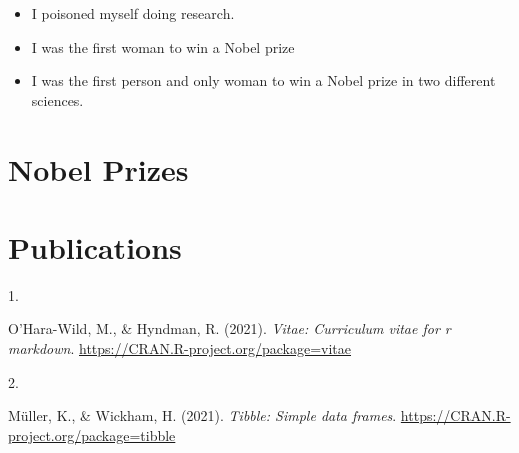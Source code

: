 \documentclass[10pt,a4paper,]{twentysecondcv}
\providecommand{\tightlist}{%
  \setlength{\itemsep}{0pt}\setlength{\parskip}{0pt}}
\newlength{\csllabelwidth}
\newcommand{\CSLLeftMargin}[1]{\parbox[t]{\csllabelwidth}{#1}}
\newcommand{\CSLRightInline}[1]{\parbox[t]{\linewidth - \csllabelwidth}{#1}}
\begin{document}
\begin{itemize}
\tightlist
\item
  I poisoned myself doing research.
\item
  I was the first woman to win a Nobel prize
\item
  I was the first person and only woman to win a Nobel prize in two
  different sciences.
\end{itemize}

\hypertarget{nobel-prizes}{%
\section{Nobel Prizes}\label{nobel-prizes}}

\nopagebreak

\begin{twentyshort}
\end{twentyshort}

\hypertarget{publications}{%
\section{Publications}\label{publications}}

\hypertarget{bibliography}{}
\leavevmode{}%
\CSLLeftMargin{1. }
\CSLRightInline{O'Hara-Wild, M., \& Hyndman, R. (2021). \emph{Vitae:
Curriculum vitae for r markdown}.
\url{https://CRAN.R-project.org/package=vitae}}

\leavevmode{}%
\CSLLeftMargin{2. }
\CSLRightInline{Müller, K., \& Wickham, H. (2021). \emph{Tibble: Simple
data frames}. \url{https://CRAN.R-project.org/package=tibble}}
\end{document}
